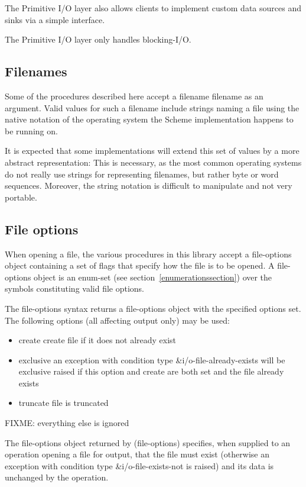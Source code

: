 The Primitive I/O layer also allows clients to implement custom data
sources and sinks via a simple interface.

The Primitive I/O layer only handles blocking-I/O.

\subsection{Filenames}

Some of the procedures described here accept a filename filename as an
argument. Valid values for such a filename include strings naming a file using
the native notation of the operating system the Scheme implementation happens
to be running on.

It is expected that some implementations will extend this set of values by a more
abstract representation: This is necessary, as the most common operating
systems do not really use strings for representing filenames, but rather byte
or word sequences. Moreover, the string notation is difficult to manipulate and
not very portable.

\subsection{File options}
\label{fileoptionssection}

When opening a file, the various procedures in this library accept a
{\cf file-options} object containing a set of flags that specify how
the file is to be opened. A {\cf file-options} object is an enum-set
(see section~\ref{enumerationssection}) over the symbols constituting
valid file options.

\begin{entry}{%
}
   
The {\cf file-options} syntax returns a file-options object with the
specified options set. The following options (all affecting output
only) may be used:

\begin{itemize}   
\item {\cf create} create file if it does not already exist
\item {\cf exclusive} an exception with condition type
  {\cf\&i/o-file-already-exists} will be exclusive raised if this
  option and {\cf create} are both set and the file already exists
\item {\cf truncate}
  file is truncated
\end{itemize}

FIXME: everything else is ignored

The file-options object returned by {\cf (file-options)} specifies,
when supplied to an operation opening a file for output, that the file
must exist (otherwise an exception with condition type
{\cf\&i/o-file-exists-not} is raised) and its data is unchanged by the
operation.
\end{entry}   

